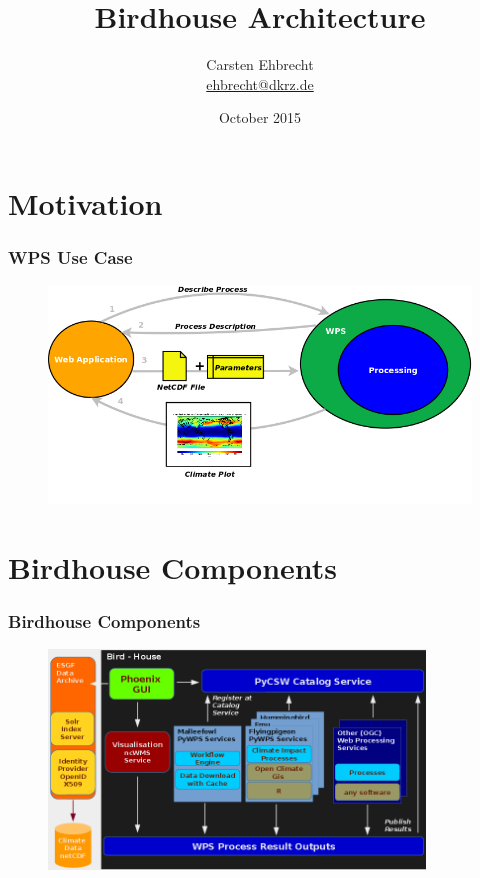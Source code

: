 \documentclass{beamer}
\title{Birdhouse Architecture}
\author{
Carsten Ehbrecht\\
\medskip
{\scriptsize \url{ehbrecht@dkrz.de}}
}
\institute{German Climate Computing Center (DKRZ)}
\date{October 2015}
\begin{document}
  \begin{frame}[plain]
    \titlepage
  \end{frame}


  \section{Motivation}

  \begin{frame}[plain]
    \frametitle{WPS Use Case}
    \begin{figure}
      \includegraphics[width=11.5cm]{images/WpsUseCase.png}
    \end{figure}
  \end{frame}

  \section{Birdhouse Components}

  \begin{frame}
    \frametitle{Birdhouse Components}
     \begin{figure}
       \begin{center}
         \includegraphics[width=10cm]{images/birdhouse.png}
       \end{center}
    \end{figure}
  \end{frame}
\end{document}
